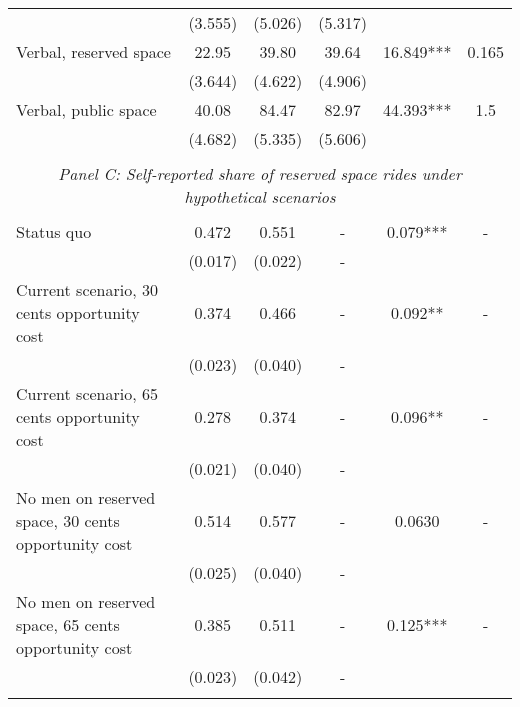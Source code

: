 \begin{tabular}{lccccc}
 & (3.555) & (5.026) & (5.317) &  &  \\
Verbal, reserved space & 22.95 & 39.80 & 39.64 & 16.849*** & 0.165 \\
 & (3.644) & (4.622) & (4.906) &  &  \\
Verbal, public space & 40.08 & 84.47 & 82.97 & 44.393*** & 1.5\\
 & (4.682) & (5.335) & (5.606) &  &  \\
\\[-1ex] \multicolumn{6}{c}{\textit{Panel C: Self-reported share of reserved space rides under hypothetical scenarios}} \\ \\[-1ex] Status quo & 0.472 & 0.551 & - & 0.079*** & - \\
 & (0.017) & (0.022) & - &  &  \\
Current scenario, 30 cents opportunity cost & 0.374 & 0.466 & - & 0.092** & - \\
 & (0.023) & (0.040) & - &  &  \\
Current scenario, 65 cents opportunity cost & 0.278 & 0.374 & - & 0.096** & - \\
 & (0.021) & (0.040) & - &  &  \\
No men on reserved space, 30 cents opportunity cost & 0.514 & 0.577 & - & 0.0630 & - \\
 & (0.025) & (0.040) & - &  &  \\
No men on reserved space, 65 cents opportunity cost & 0.385 & 0.511 & - & 0.125*** & - \\
 & (0.023) & (0.042) & - &  &  \\ \\[-1.8ex] \hline\hline
\end{tabular}

